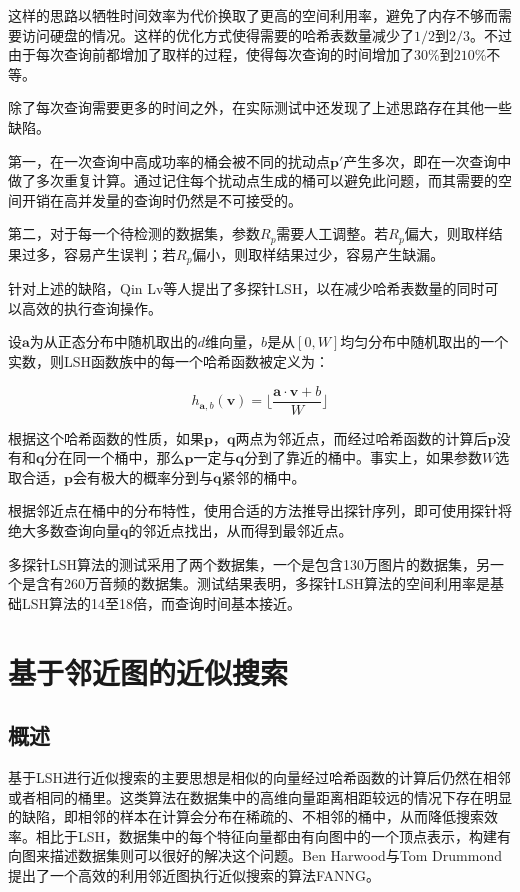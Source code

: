 这样的思路以牺牲时间效率为代价换取了更高的空间利用率，避免了内存不够而需要访问硬盘的情况。这样的优化方式使得需要的哈希表数量减少了$1/2$到$2/3$\cite{lv2007multi}。不过由于每次查询前都增加了取样的过程，使得每次查询的时间增加了$30\%$到$210\%$不等。

除了每次查询需要更多的时间之外，在实际测试中还发现了上述思路存在其他一些缺陷。

第一，在一次查询中高成功率的桶会被不同的扰动点$\mathbf{p'}$产生多次，即在一次查询中做了多次重复计算。通过记住每个扰动点生成的桶可以避免此问题，而其需要的空间开销在高并发量的查询时仍然是不可接受的。

第二，对于每一个待检测的数据集，参数$R_p$需要人工调整。若$R_p$偏大，则取样结果过多，容易产生误判；若$R_p$偏小，则取样结果过少，容易产生缺漏。

针对上述的缺陷，Qin Lv等人提出了多探针LSH\cite{lv2007multi}，以在减少哈希表数量的同时可以高效的执行查询操作。

设$\mathbf{a}$为从正态分布中随机取出的$d$维向量，$b$是从$[0,W]$均匀分布中随机取出的一个实数，则LSH函数族中的每一个哈希函数被定义为：

\begin{equation}
	h_{\mathbf{a},b}(\mathbf{v})=\Big\lfloor\frac{\mathbf{a}\cdot \mathbf{v}+b}{W} \Big\rfloor
\end{equation}

根据这个哈希函数的性质，如果$\mathbf{p}$，$\mathbf{q}$两点为邻近点，而经过哈希函数的计算后$\mathbf{p}$没有和$\mathbf{q}$分在同一个桶中，那么$\mathbf{p}$一定与$\mathbf{q}$分到了靠近的桶中。事实上，如果参数$W$选取合适，$\mathbf{p}$会有极大的概率分到与$\mathbf{q}$紧邻的桶中。

根据邻近点在桶中的分布特性，使用合适的方法推导出探针序列，即可使用探针将绝大多数查询向量$\mathbf{q}$的邻近点找出，从而得到最邻近点。

多探针LSH算法的测试采用了两个数据集，一个是包含130万图片的数据集，另一个是含有260万音频的数据集。测试结果表明，多探针LSH算法的空间利用率是基础LSH算法的14至18倍，而查询时间基本接近\cite{lv2007multi}。


\section{基于邻近图的近似搜索}

\subsection{概述}

基于LSH进行近似搜索的主要思想是相似的向量经过哈希函数的计算后仍然在相邻或者相同的桶里。这类算法在数据集中的高维向量距离相距较远的情况下存在明显的缺陷，即相邻的样本在计算会分布在稀疏的、不相邻的桶中，从而降低搜索效率。相比于LSH，数据集中的每个特征向量都由有向图中的一个顶点表示，构建有向图来描述数据集则可以很好的解决这个问题。Ben Harwood与Tom Drummond提出了一个高效的利用邻近图执行近似搜索的算法FANNG\cite{harwood2016fanng}。

